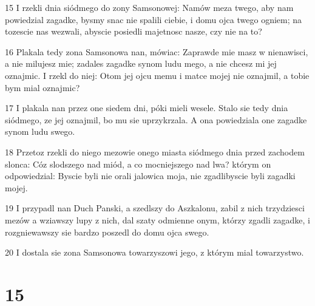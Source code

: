 \par 15 I rzekli dnia siódmego do zony Samsonowej: Namów meza twego, aby nam powiedzial zagadke, bysmy snac nie spalili ciebie, i domu ojca twego ogniem; na tozescie nas wezwali, abyscie posiedli majetnosc nasze, czy nie na to?
\par 16 Plakala tedy zona Samsonowa nan, mówiac: Zaprawde mie masz w nienawisci, a nie milujesz mie; zadales zagadke synom ludu mego, a nie chcesz mi jej oznajmic. I rzekl do niej: Otom jej ojcu memu i matce mojej nie oznajmil, a tobie bym mial oznajmic?
\par 17 I plakala nan przez one siedem dni, póki mieli wesele. Stalo sie tedy dnia siódmego, ze jej oznajmil, bo mu sie uprzykrzala. A ona powiedziala one zagadke synom ludu swego.
\par 18 Przetoz rzekli do niego mezowie onego miasta siódmego dnia przed zachodem slonca: Cóz slodszego nad miód, a co mocniejszego nad lwa? którym on odpowiedzial: Byscie byli nie orali jalowica moja, nie zgadlibyscie byli zagadki mojej.
\par 19 I przypadl nan Duch Panski, a szedlszy do Aszkalonu, zabil z nich trzydziesci mezów a wziawszy lupy z nich, dal szaty odmienne onym, którzy zgadli zagadke, i rozgniewawszy sie bardzo poszedl do domu ojca swego.
\par 20 I dostala sie zona Samsonowa towarzyszowi jego, z którym mial towarzystwo.

\chapter{15}

